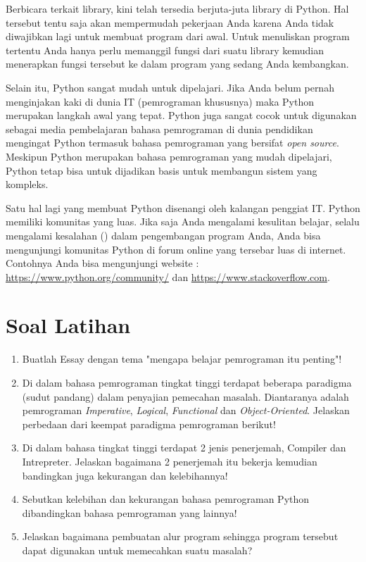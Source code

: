 Berbicara terkait library, kini telah tersedia berjuta-juta library di Python. Hal tersebut tentu saja akan mempermudah pekerjaan Anda karena Anda tidak diwajibkan lagi untuk membuat program dari awal. Untuk menuliskan program tertentu Anda hanya perlu memanggil fungsi dari suatu library kemudian menerapkan fungsi tersebut ke dalam program yang sedang Anda kembangkan.

Selain itu, Python sangat mudah untuk dipelajari. Jika Anda belum pernah menginjakan kaki di dunia IT (pemrograman khususnya) maka Python merupakan langkah awal yang tepat. Python juga sangat cocok untuk digunakan sebagai media pembelajaran bahasa pemrograman di dunia pendidikan mengingat Python termasuk bahasa pemrograman yang bersifat \textit{open source}. Meskipun Python merupakan bahasa pemrograman yang mudah dipelajari, Python tetap bisa untuk dijadikan basis untuk membangun sistem yang kompleks.

Satu hal lagi yang membuat Python disenangi oleh kalangan penggiat IT. Python memiliki komunitas yang luas. Jika saja Anda mengalami kesulitan belajar, selalu mengalami kesalahan () dalam pengembangan program Anda, Anda bisa mengunjungi komunitas Python di forum online yang tersebar luas di internet. Contohnya Anda bisa mengunjungi website : \url{https://www.python.org/community/} dan \url{https://www.stackoverflow.com}.

\section{Soal Latihan}
\begin{enumerate}
	\item Buatlah Essay dengan tema "mengapa belajar pemrograman itu penting"!
	\item Di dalam bahasa pemrograman tingkat tinggi terdapat beberapa paradigma (sudut pandang) dalam  penyajian pemecahan masalah. Diantaranya adalah pemrograman \textit{Imperative}, \textit{Logical}, \textit{Functional} dan \textit{Object-Oriented}. Jelaskan perbedaan dari keempat paradigma pemrograman berikut!
	\item Di dalam bahasa tingkat tinggi terdapat 2 jenis penerjemah, Compiler dan Intrepreter. Jelaskan bagaimana 2 penerjemah itu bekerja kemudian bandingkan juga kekurangan dan kelebihannya!
	\item Sebutkan kelebihan dan kekurangan bahasa pemrograman Python dibandingkan bahasa pemrograman yang lainnya!
	\item Jelaskan bagaimana pembuatan alur program sehingga program tersebut dapat digunakan untuk memecahkan suatu masalah?
\end{enumerate}
